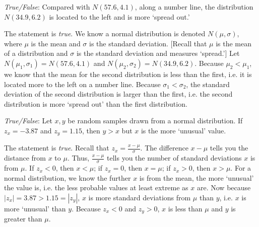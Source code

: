 \documentclass[11pt,letterpaper]{article}
\begin{document}
\quizsol \textit{True/False}: Compared with $N(57.6, 4.1)$, along a number line, the distribution $N(34.9, 6.2)$ is located to the left and is more `spread out.' \pspace

\sol The statement is \textit{true}. We know a normal distribution is denoted $N(\mu, \sigma)$, where $\mu$ is the mean and $\sigma$ is the standard deviation. [Recall that $\mu$ is the mean of a distribution and $\sigma$ is the standard deviation and measures `spread.'] Let $N(\mu_1, \sigma_1)= N(57.6, 4.1)$ and $N(\mu_2, \sigma_2)= N(34.9, 6.2)$. Because $\mu_2 < \mu_1$, we know that the mean for the second distribution is less than the first, i.e. it is located more to the left on a number line. Because $\sigma_1 < \sigma_2$, the standard deviation of the second distribution is larger than the first, i.e. the second distribution is more `spread out' than the first distribution. \pvspace{1.3cm}



\quizsol \textit{True/False}: Let $x, y$ be random samples drawn from a normal distribution. If $z_x= -3.87$ and $z_y= 1.15$, then $y > x$ but $x$ is the more `unusual' value. \pspace

\sol The statement is \textit{true}. Recall that $z_x= \frac{x - \mu}{\sigma}$. The difference $x - \mu$ tells you the distance from $x$ to $\mu$. Thus, $\frac{x - \mu}{\sigma}$ tells you the number of standard deviations $x$ is from $\mu$. If $z_x < 0$, then $x < \mu$; if $z_x= 0$, then $x= \mu$; if $z_x > 0$, then $x > \mu$. For a normal distribution, we know the further $x$ is from the mean, the more `unusual' the value is, i.e. the less probable values at least extreme as $x$ are. Now because $|z_x|= 3.87 > 1.15= |z_y|$, $x$ is more standard deviations from $\mu$ than $y$, i.e. $x$ is more `unusual' than $y$. Because $z_x < 0$ and $z_y> 0$, $x$ is less than $\mu$ and $y$ is greater than $\mu$. \pvspace{1.3cm}









\end{document}
